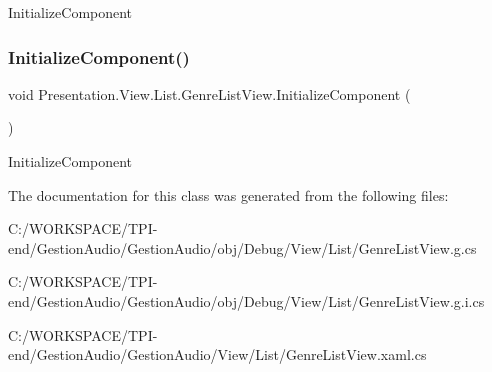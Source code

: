 Initialize\+Component 

\mbox{\label{class_presentation_1_1_view_1_1_list_1_1_genre_list_view_a5f6099fc62c1c6be505c094bacca79ca}} 
\subsubsection{\texorpdfstring{Initialize\+Component()}{InitializeComponent()}\hspace{0.1cm}{\footnotesize\ttfamily [4/4]}}
{\footnotesize\ttfamily void Presentation.\+View.\+List.\+Genre\+List\+View.\+Initialize\+Component (\begin{DoxyParamCaption}{ }\end{DoxyParamCaption})}



Initialize\+Component 



The documentation for this class was generated from the following files\+:\begin{DoxyCompactItemize}
\item 
C\+:/\+W\+O\+R\+K\+S\+P\+A\+C\+E/\+T\+P\+I-\/end/\+Gestion\+Audio/\+Gestion\+Audio/obj/\+Debug/\+View/\+List/Genre\+List\+View.\+g.\+cs\item 
C\+:/\+W\+O\+R\+K\+S\+P\+A\+C\+E/\+T\+P\+I-\/end/\+Gestion\+Audio/\+Gestion\+Audio/obj/\+Debug/\+View/\+List/Genre\+List\+View.\+g.\+i.\+cs\item 
C\+:/\+W\+O\+R\+K\+S\+P\+A\+C\+E/\+T\+P\+I-\/end/\+Gestion\+Audio/\+Gestion\+Audio/\+View/\+List/Genre\+List\+View.\+xaml.\+cs\end{DoxyCompactItemize}
